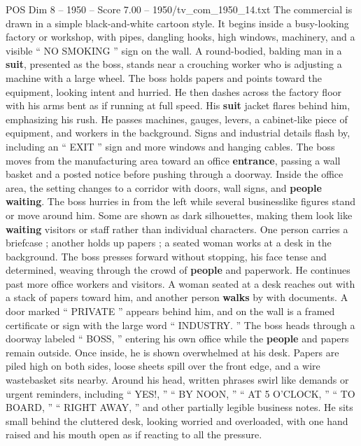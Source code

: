 \begin{textsample}{POS Dim 8 – 1950 – Score 7.00 – 1950/tv\_com\_1950\_14.txt}  \label{ex:f8_pos_072}
The commercial is drawn in a simple black-and-white cartoon style.
It begins inside a busy-looking factory or workshop, with pipes, dangling hooks, high windows, machinery, and a visible “ NO SMOKING ” sign on the wall.
A round-bodied, balding man in a \textbf{suit}, presented as the boss, stands near a crouching worker who is adjusting a machine with a large wheel.
The boss holds papers and points toward the equipment, looking intent and hurried.
He then dashes across the factory floor with his arms bent as if running at full speed.
His \textbf{suit} jacket flares behind him, emphasizing his rush.
He passes machines, gauges, levers, a cabinet-like piece of equipment, and workers in the background.
Signs and industrial details flash by, including an “ EXIT ” sign and more windows and hanging cables.
The boss moves from the manufacturing area toward an office \textbf{entrance}, passing a wall basket and a posted notice before pushing through a doorway.
Inside the office area, the setting changes to a corridor with doors, wall signs, and \textbf{people} \textbf{waiting}.
The boss hurries in from the left while several businesslike figures stand or move around him.
Some are shown as dark silhouettes, making them look like \textbf{waiting} visitors or staff rather than individual characters.
One person carries a briefcase ; another holds up papers ; a seated woman works at a desk in the background.
The boss presses forward without stopping, his face tense and determined, weaving through the crowd of \textbf{people} and paperwork.
He continues past more office workers and visitors.
A woman seated at a desk reaches out with a stack of papers toward him, and another person \textbf{walks} by with documents.
A door marked “ PRIVATE ” appears behind him, and on the wall is a framed certificate or sign with the large word “ INDUSTRY. ” The boss heads through a doorway labeled “ BOSS, ” entering his own office while the \textbf{people} and papers remain outside.
Once inside, he is shown overwhelmed at his desk.
Papers are piled high on both sides, loose sheets spill over the front edge, and a wire wastebasket sits nearby.
Around his head, written phrases swirl like demands or urgent reminders, including “ YES!, ” “ BY NOON, ” “ AT 5 O’CLOCK, ” “ TO BOARD, ” “ RIGHT AWAY, ” and other partially legible business notes.
He sits small behind the cluttered desk, looking worried and overloaded, with one hand raised and his mouth open as if reacting to all the pressure.

\end{textsample}
